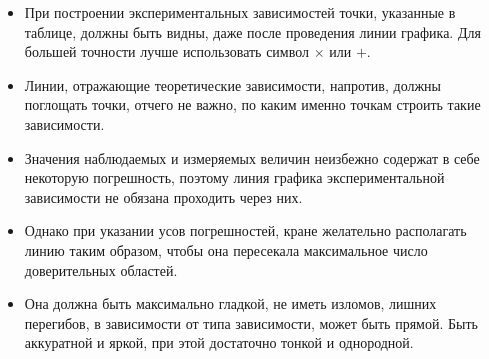 \begin{itemize}
\begin{figure}
\begin{subcaptionblock}[t]{0.46\tw}
        \caption{Запрещенные ряды. Числа оцифровки горизонтальной оси указаны с разной точностью. По вертикальной оси штрихи и оцифровка сделаны через разные промежутки.}  
    \end{subcaptionblock}
    \hfill\!\!\!~
    \caption{}
\end{figure}    
    
    \item При построении экспериментальных зависимостей точки, указанные в таблице, должны быть видны, даже после проведения линии графика. Для большей точности лучше использовать символ $\times$ или $+$.
    
    \item Линии, отражающие теоретические зависимости, напротив, должны поглощать точки, отчего не важно, по каким именно точкам строить такие зависимости.
    
    \item Значения наблюдаемых и измеряемых величин неизбежно содержат в себе некоторую погрешность, поэтому линия графика экспериментальной зависимости не обязана проходить через них. 

    \item Однако при указании усов погрешностей, кране желательно располагать линию таким образом, чтобы она пересекала максимальное число доверительных областей.
    
    \item Она должна быть максимально гладкой, не иметь изломов, лишних перегибов, в зависимости от типа зависимости, может быть прямой. Быть аккуратной и яркой, при этой достаточно тонкой и однородной.
    
    
    
\end{itemize}
